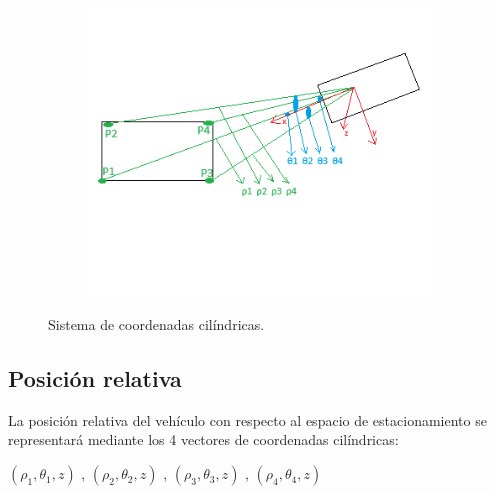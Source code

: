 \begin{figure}[!ht]
\begin{subfigure}{0.4\textwidth}
        \includegraphics[width=\textwidth]{img/distances_ubi_32}\label {fig:distances32}
    \end{subfigure}
    \caption{Sistema de coordenadas cilíndricas.}
    \label{fig:coord3}
\end{figure}

\subsection{Posición relativa}
La posición relativa del vehículo con respecto al espacio de estacionamiento se representará mediante los 4 vectores de coordenadas cilíndricas:\\
\begin{center}
    $(\rho_1, \theta_1, z)$ , $(\rho_2, \theta_2, z)$ , $(\rho_3, \theta_3, z)$ , $(\rho_4, \theta_4, z)$ \\

\end{center}




